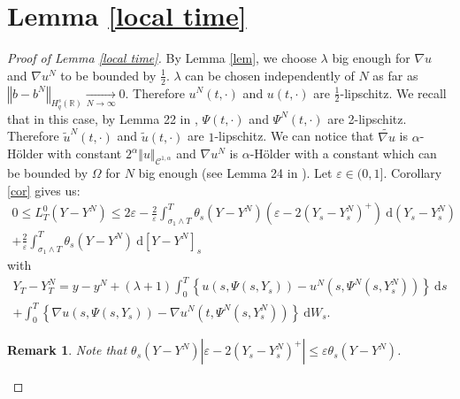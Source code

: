 \documentclass[11pt]{enstaPRE}
\newtheorem{rem}{Remark}
\newcommand{\norme}[1]{\left\Vert #1\right\Vert}
\newcommand{\R}{\mathbb{R}}
\newcommand{\di}{\mathrm{d}}
\begin{document}
\section{Lemma \ref{local time}}

\begin{proof}[Proof of Lemma \ref{local time}]
    By Lemma \ref{lem}, we choose $\lambda$ big enough for $\nabla u$ and $\nabla u^N$ to be bounded by $\frac{1}{2}$. $\lambda$ can be chosen independently of $N$ as far as $\norme{b - b^N}_{H_q^s(\R)} \underset{N\rightarrow\infty}{\longrightarrow} 0$. Therefore $u^N(t,\cdot)$ and $u(t,\cdot)$ are $\frac{1}{2}$-lipschitz. We recall that in this case, by Lemma 22 in \cite{Fla-Iss-Rus-2017}, $\Psi(t,\cdot)$ and $\Psi^N(t,\cdot)$ are 2-lipschitz. Therefore $\widetilde{u}^N(t,\cdot)$ and $\widetilde{u}(t,\cdot)$ are $1$-lipschitz. We can notice that $\widetilde{\nabla u}$ is $\alpha$-Hölder with constant $2^\alpha\norme{u}_{\mathcal{C}^{1,\alpha}}$ and $\nabla u^N$ is $\alpha$-Hölder with a constant which can be bounded by $\Omega$ for $N$ big enough (see Lemma 24 in \cite{Fla-Iss-Rus-2017}).
    Let $\varepsilon\in(0,1]$. Corollary \ref{cor} gives us:    
    \begin{multline*}
    0\leq L^0_T(Y-Y^N) \leq 2\varepsilon - \frac{2}{\varepsilon}\int_{\sigma_1\wedge T}^T \theta_s(Y-Y^N) \left(\varepsilon - 2{(Y_s-Y_s^N)^+}\right)\ \di \left(Y_s-Y_s^N\right)\\
    +\frac{2}{\varepsilon}\int_{\sigma_1\wedge T}^T \theta_s(Y-Y^N) \ \di\left[Y-Y^N\right]_s
    \end{multline*}    
    with
    \begin{multline*}    
    Y_T-Y_T^N = y-y^N + (\lambda + 1 )\int_0^T\left\{u\left(s,\Psi\left(s,Y_s\right)\right)-u^N\left(s,\Psi^N\left(s,Y_s^N\right)\right)\right\}\ \di s\\ + \int_0^T\left\{\nabla u\left(s,\Psi\left(s,Y_s\right)\right)-\nabla u^N\left(t,\Psi^N\left(s,Y_s^N\right)\right)\right\}\ \di W_s.
    \end{multline*}    
    \begin{rem}
        Note that $\theta_s(Y-Y^N) \left|\varepsilon - 2{(Y_s-Y_s^N)^+}\right|\leq \varepsilon\theta_s(Y-Y^N)$.
    \end{rem}    
    

\end{proof}
\end{document}
